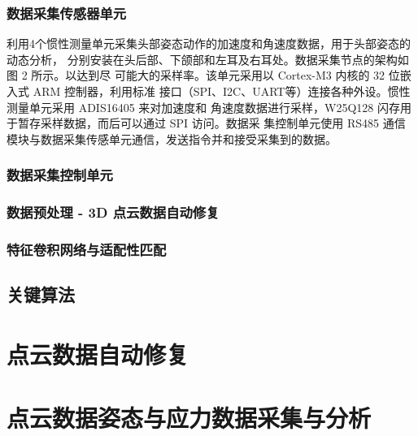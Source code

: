 \documentclass[a4paper,12pt]{ctexbook}	%
\begin{document}
\subsection{数据采集传感器单元}

{\songti 
利用4个惯性测量单元采集头部姿态动作的加速度和角速度数据，用于头部姿态的动态分析，
分别安装在头后部、下颌部和左耳及右耳处。数据采集节点的架构如图 2 所示。以达到尽
可能大的采样率。该单元采用以 Cortex-M3 内核的 32 位嵌入式 ARM 控制器，利用标准
接口（SPI、I2C、UART等）连接各种外设。惯性测量单元采用 ADIS16405 来对加速度和
角速度数据进行采样，W25Q128 闪存用于暂存采样数据，而后可以通过 SPI 访问。数据采
集控制单元使用 RS485 通信模块与数据采集传感单元通信，发送指令并和接受采集到的数据。
}

\subsection{数据采集控制单元}

{\songti 
}

\subsection{数据预处理 - 3D 点云数据自动修复}

\subsection{特征卷积网络与适配性匹配}

\section{关键算法}


\chapter{点云数据自动修复}

\chapter{点云数据姿态与应力数据采集与分析}
\end{document}
